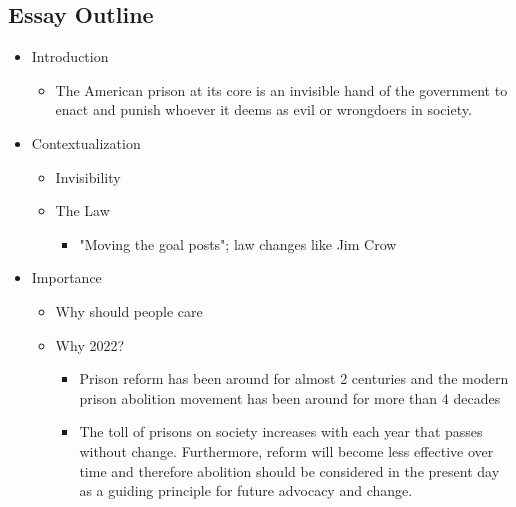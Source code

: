 \subsection*{Essay Outline}

\begin{itemize}
	\item Introduction
		\begin{itemize}
			\item The American prison at its core is an invisible hand of the government to enact and punish whoever it deems as evil or wrongdoers in society.
		\end{itemize}
	\item Contextualization
		\begin{itemize}
			\item Invisibility
			\item The Law
				\begin{itemize}
					\item "Moving the goal posts"; law changes like Jim Crow
				\end{itemize}
		\end{itemize}
	\item Importance
		\begin{itemize}
			\item Why should people care
			\item Why 2022?
				\begin{itemize}
					\item Prison reform has been around for almost 2 centuries and the modern prison abolition movement has been around for more than 4 decades
					\item The toll of prisons on society increases with each year that passes without change. Furthermore, reform will become less effective over time and therefore abolition should be considered in the present day as a guiding principle for future advocacy and change.
				\end{itemize}
		\end{itemize}
\end{itemize}
